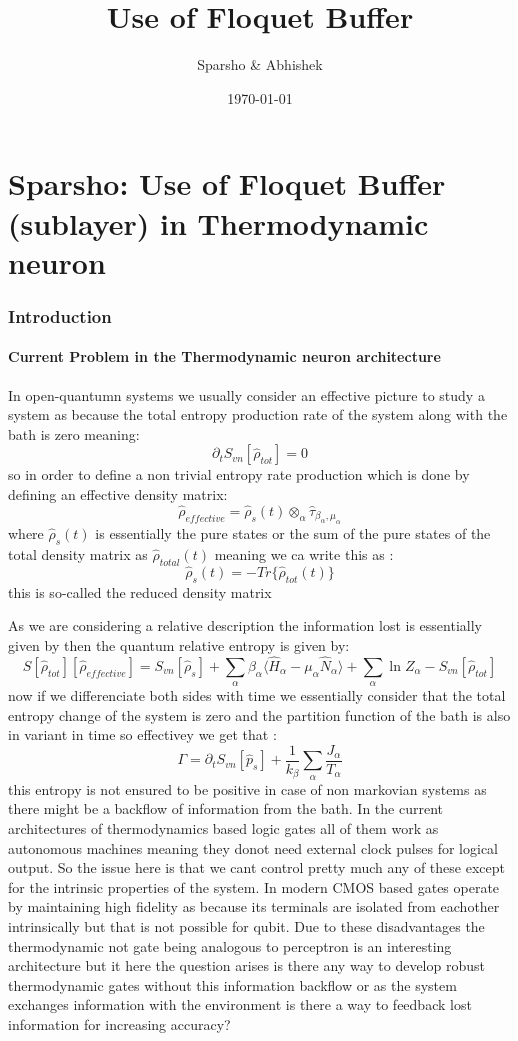 \documentclass[11pt,a4paper]{article}
\title{Use of Floquet Buffer}
\author{Sparsho \& Abhishek}
\date{\today}
\theoremstyle{definition}
\theoremstyle{remark}
\begin{document}
\maketitle

\tableofcontents

\part{Sparsho: Use of Floquet Buffer (sublayer) in Thermodynamic neuron}
\section{Introduction}
\subsection{Current Problem in the Thermodynamic neuron  architecture}
In open-quantumn systems we usually consider an effective picture to study a system as because the total entropy production rate of the system along with the bath is zero meaning:
\[
\partial_t{S_{vn}[\hat{\rho}_{tot}]} = 0
\]
so in order to define a non trivial entropy rate production which is done by defining an effective density matrix:
\[
\hat{\rho}_{effective} = \hat{\rho}_s(t) \otimes_\alpha \hat{\tau}_{\beta_\alpha , \mu_\alpha }
\] where 
\( \hat{\rho}_s(t)\) is essentially the pure states or the sum of the pure states of the total density matrix as 
\(\hat{\rho}_{total}(t)\) meaning we ca write this as :
\[
\hat{\rho}_s(t) = -Tr\{ \hat{\rho}_{tot}(t) \}
\] this is so-called the reduced density matrix

As we are considering a relative description the information lost is essentially given by then the quantum relative entropy is given by:
\[
 S[\hat{\rho}_{tot}][\hat{\rho}_{effective}] = S_{vn}[\hat{\rho}_s] + \sum_\alpha \beta_\alpha\langle\hat{H}_\alpha - \mu_\alpha \hat{N}_\alpha\rangle + \sum_\alpha \ln Z_\alpha - S_{vn}[\hat{\rho}_{tot}]
\]
 now if we differenciate both sides with time we essentially consider that the total entropy change of the system is zero and the partition function of the bath is also in variant in time so effectivey we get that :
\[
\Gamma = \partial_t{S_{vn}[\hat{p}_s]}+ \frac{1}{k_\beta}\sum_\alpha \frac{J_\alpha}{T_\alpha}
\] 
this entropy is not ensured to be positive in case of non markovian systems as there might be a backflow of information from the bath.
In the current architectures of thermodynamics based logic gates all of them work as autonomous machines meaning they donot need external clock pulses for logical output. 
So the issue here is that we cant control pretty much any of these except for the intrinsic properties of the system. In modern CMOS based gates operate by maintaining high fidelity as because its terminals are isolated from eachother intrinsically but that is not possible for qubit. Due to these disadvantages the thermodynamic not gate being analogous to perceptron is an interesting architecture but it here the question arises is there any way to develop robust thermodynamic gates without this information backflow or as the system exchanges information with the environment is there a way to feedback lost information for increasing accuracy?
\end{document}
